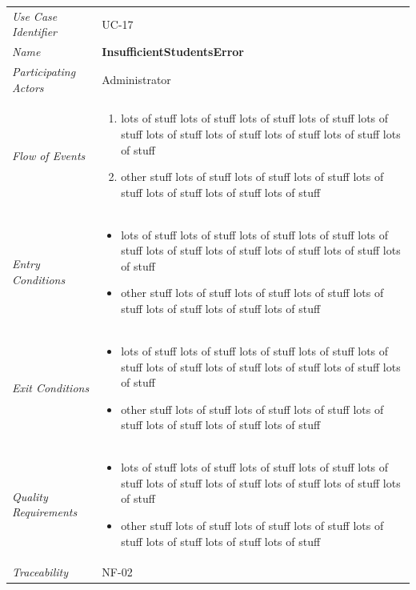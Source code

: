 \documentclass[12pt,letterpaper]{article}
\begin{document}
\begin{center}
	\begin{tabu} to 
		\toprule
		Use Case Identifier & UC-17 \\
		Name & {\bf InsufficientStudentsError} \\
		Participating Actors & Administrator \\
		Flow of Events & 
	    \begin{enumerate}[topsep=-1em]
		    \item lots of stuff lots of stuff lots of stuff lots of stuff lots of stuff lots of stuff lots of stuff lots of stuff lots of stuff lots of stuff
		    \item other stuff lots of stuff lots of stuff lots of stuff lots of stuff lots of stuff lots of stuff lots of stuff
		\end{enumerate} \\

		Entry Conditions &
		\begin{itemize}[topsep=-1em]
		    \item lots of stuff lots of stuff lots of stuff lots of stuff lots of stuff lots of stuff lots of stuff lots of stuff lots of stuff lots of stuff
		    \item other stuff lots of stuff lots of stuff lots of stuff lots of stuff lots of stuff lots of stuff lots of stuff
        \end{itemize} \\

		Exit Conditions &
		\begin{itemize}[topsep=-1em]
		    \item lots of stuff lots of stuff lots of stuff lots of stuff lots of stuff lots of stuff lots of stuff lots of stuff lots of stuff lots of stuff
		    \item other stuff lots of stuff lots of stuff lots of stuff lots of stuff lots of stuff lots of stuff lots of stuff
        \end{itemize} \\

		Quality Requirements &
		\begin{itemize}[topsep=-1em]
		    \item lots of stuff lots of stuff lots of stuff lots of stuff lots of stuff lots of stuff lots of stuff lots of stuff lots of stuff lots of stuff
		    \item other stuff lots of stuff lots of stuff lots of stuff lots of stuff lots of stuff lots of stuff lots of stuff
        \end{itemize} \\

		Traceability & NF-02 \\
		\toprule
	\end{tabu}
\end{center}
\end{document}
